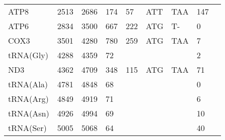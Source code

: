 \documentclass[../DISSERTACAO_MAIN.tex]{subfiles}
\begin{document}
\begin{longtable}{llllllllllllllllllllll}
			ATP8         & \multicolumn{2}{l}{2513}    & \multicolumn{2}{l}{2686}    & \multicolumn{2}{l}{174}         & \multicolumn{3}{l}{57}                        & \multicolumn{3}{l}{ATT}   & \multicolumn{3}{l}{TAA}     & \multicolumn{3}{l}{147}         & \multicolumn{3}{l}{}         \\
			ATP6         & \multicolumn{2}{l}{2834}    & \multicolumn{2}{l}{3500}    & \multicolumn{2}{l}{667}         & \multicolumn{3}{l}{222}                       & \multicolumn{3}{l}{ATG}   & \multicolumn{3}{l}{T-}      & \multicolumn{3}{l}{0}           & \multicolumn{3}{l}{}         \\
			COX3         & \multicolumn{2}{l}{3501}    & \multicolumn{2}{l}{4280}    & \multicolumn{2}{l}{780}         & \multicolumn{3}{l}{259}                       & \multicolumn{3}{l}{ATG}   & \multicolumn{3}{l}{TAA}     & \multicolumn{3}{l}{7}           & \multicolumn{3}{l}{}         \\
			tRNA(Gly)    & \multicolumn{2}{l}{4288}    & \multicolumn{2}{l}{4359}    & \multicolumn{2}{l}{72}          & \multicolumn{3}{l}{}                          & \multicolumn{3}{l}{}      & \multicolumn{3}{l}{}        & \multicolumn{3}{l}{2}           & \multicolumn{3}{l}{}         \\
			ND3          & \multicolumn{2}{l}{4362}    & \multicolumn{2}{l}{4709}    & \multicolumn{2}{l}{348}         & \multicolumn{3}{l}{115}                       & \multicolumn{3}{l}{ATG}   & \multicolumn{3}{l}{TAA}     & \multicolumn{3}{l}{71}          & \multicolumn{3}{l}{}         \\
			tRNA(Ala)    & \multicolumn{2}{l}{4781}    & \multicolumn{2}{l}{4848}    & \multicolumn{2}{l}{68}          & \multicolumn{3}{l}{}                          & \multicolumn{3}{l}{}      & \multicolumn{3}{l}{}        & \multicolumn{3}{l}{0}           & \multicolumn{3}{l}{}         \\
			tRNA(Arg)    & \multicolumn{2}{l}{4849}    & \multicolumn{2}{l}{4919}    & \multicolumn{2}{l}{71}          & \multicolumn{3}{l}{}                          & \multicolumn{3}{l}{}      & \multicolumn{3}{l}{}        & \multicolumn{3}{l}{6}           & \multicolumn{3}{l}{}         \\
			tRNA(Asn)    & \multicolumn{2}{l}{4926}    & \multicolumn{2}{l}{4994}    & \multicolumn{2}{l}{69}          & \multicolumn{3}{l}{}                          & \multicolumn{3}{l}{}      & \multicolumn{3}{l}{}        & \multicolumn{3}{l}{10}          & \multicolumn{3}{l}{}         \\
			tRNA(Ser)    & \multicolumn{2}{l}{5005}    & \multicolumn{2}{l}{5068}    & \multicolumn{2}{l}{64}          & \multicolumn{3}{l}{}                          & \multicolumn{3}{l}{}      & \multicolumn{3}{l}{}        & \multicolumn{3}{l}{40}          & \multicolumn{3}{l}{}         \\

\end{longtable}
\end{document}
